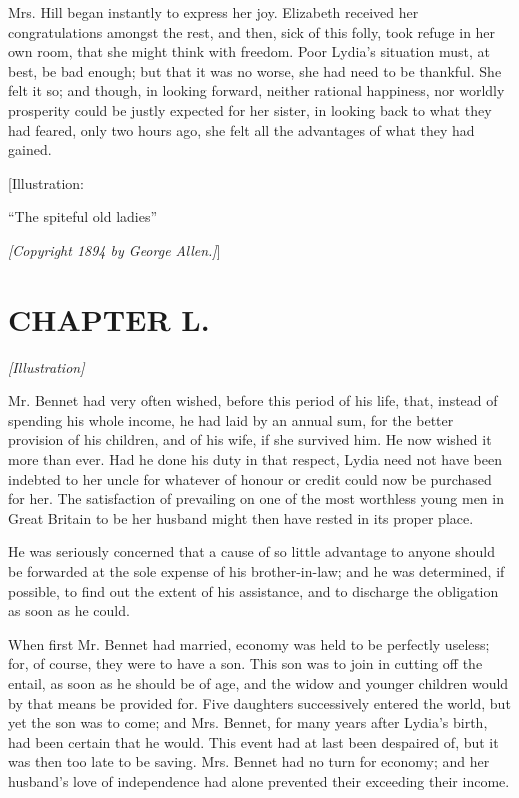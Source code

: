 \documentclass[12pt]{book}
\begin{document}
Mrs. Hill began instantly to express her joy. Elizabeth received her congratulations amongst the rest, and then, sick of this folly, took refuge in her own room, that she might think with freedom. Poor Lydia's situation must, at best, be bad enough; but that it was no worse, she had need to be thankful. She felt it so; and though, in looking forward, neither rational happiness, nor worldly prosperity could be justly expected for her sister, in looking back to what they had feared, only two hours ago, she felt all the advantages of what they had gained.

[Illustration:

``The spiteful old ladies''

\emph{[\textit{Copyright 1894 by George Allen.}]}]

\chapter{CHAPTER L.}

\emph{[Illustration]}

Mr. Bennet had very often wished, before this period of his life, that, instead of spending his whole income, he had laid by an annual sum, for the better provision of his children, and of his wife, if she survived him. He now wished it more than ever. Had he done his duty in that respect, Lydia need not have been indebted to her uncle for whatever of honour or credit could now be purchased for her. The satisfaction of prevailing on one of the most worthless young men in Great Britain to be her husband might then have rested in its proper place.

He was seriously concerned that a cause of so little advantage to anyone should be forwarded at the sole expense of his brother-in-law; and he was determined, if possible, to find out the extent of his assistance, and to discharge the obligation as soon as he could.

When first Mr. Bennet had married, economy was held to be perfectly useless; for, of course, they were to have a son. This son was to join in cutting off the entail, as soon as he should be of age, and the widow and younger children would by that means be provided for. Five daughters successively entered the world, but yet the son was to come; and Mrs. Bennet, for many years after Lydia's birth, had been certain that he would. This event had at last been despaired of, but it was then too late to be saving. Mrs. Bennet had no turn for economy; and her husband's love of independence had alone prevented their exceeding their income.
\end{document}
